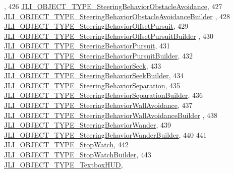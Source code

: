 \begin{DoxyCode}
      ,
426     \mbox{\hyperlink{namespacenjli_a6d56d4fbaf89fcf3e3d32839df05b444a0d10857a9faf274e5f399d970cffab54}{JLI\_OBJECT\_TYPE\_SteeringBehaviorObstacleAvoidance}},
427     \mbox{\hyperlink{namespacenjli_a6d56d4fbaf89fcf3e3d32839df05b444a8db2ac2e3bf1b4b54e8eef5ec82bb31e}{JLI\_OBJECT\_TYPE\_SteeringBehaviorObstacleAvoidanceBuilder}}
      ,
428     \mbox{\hyperlink{namespacenjli_a6d56d4fbaf89fcf3e3d32839df05b444a8f02954dcc21dfbdac47ad78d3fde3f5}{JLI\_OBJECT\_TYPE\_SteeringBehaviorOffsetPursuit}},
429     \mbox{\hyperlink{namespacenjli_a6d56d4fbaf89fcf3e3d32839df05b444ad7d8d479d51b4382207ab5d998aa3cfb}{JLI\_OBJECT\_TYPE\_SteeringBehaviorOffsetPursuitBuilder}}
      ,
430     \mbox{\hyperlink{namespacenjli_a6d56d4fbaf89fcf3e3d32839df05b444a367d51e7c5cf64bc1d4c933291d7b38d}{JLI\_OBJECT\_TYPE\_SteeringBehaviorPursuit}},
431     \mbox{\hyperlink{namespacenjli_a6d56d4fbaf89fcf3e3d32839df05b444a5714a07f3cc466b9f07fdb194d885d1f}{JLI\_OBJECT\_TYPE\_SteeringBehaviorPursuitBuilder}},
432     \mbox{\hyperlink{namespacenjli_a6d56d4fbaf89fcf3e3d32839df05b444a715c36c3ae37b11295f735a932ffd577}{JLI\_OBJECT\_TYPE\_SteeringBehaviorSeek}},
433     \mbox{\hyperlink{namespacenjli_a6d56d4fbaf89fcf3e3d32839df05b444a1a9041dbd8559ce4c692394596594002}{JLI\_OBJECT\_TYPE\_SteeringBehaviorSeekBuilder}},
434     \mbox{\hyperlink{namespacenjli_a6d56d4fbaf89fcf3e3d32839df05b444a181868273499396a4865002154f6dde6}{JLI\_OBJECT\_TYPE\_SteeringBehaviorSeparation}},
435     \mbox{\hyperlink{namespacenjli_a6d56d4fbaf89fcf3e3d32839df05b444a910745b128673320d7bb577b48bda724}{JLI\_OBJECT\_TYPE\_SteeringBehaviorSeparationBuilder}},
436     \mbox{\hyperlink{namespacenjli_a6d56d4fbaf89fcf3e3d32839df05b444ae2b3447851b7ac75116251170282dbc0}{JLI\_OBJECT\_TYPE\_SteeringBehaviorWallAvoidance}},
437     \mbox{\hyperlink{namespacenjli_a6d56d4fbaf89fcf3e3d32839df05b444a8ec8e7414459952bb93962003e257328}{JLI\_OBJECT\_TYPE\_SteeringBehaviorWallAvoidanceBuilder}}
      ,
438     \mbox{\hyperlink{namespacenjli_a6d56d4fbaf89fcf3e3d32839df05b444ad509ed837897d1936482eed231b4380f}{JLI\_OBJECT\_TYPE\_SteeringBehaviorWander}},
439     \mbox{\hyperlink{namespacenjli_a6d56d4fbaf89fcf3e3d32839df05b444a388556f711c9388292a53cf5cedba35d}{JLI\_OBJECT\_TYPE\_SteeringBehaviorWanderBuilder}},
440 
441     \mbox{\hyperlink{namespacenjli_a6d56d4fbaf89fcf3e3d32839df05b444ac0fa0a9dbb9d90ae8dc50821c7a3de13}{JLI\_OBJECT\_TYPE\_StopWatch}},
442     \mbox{\hyperlink{namespacenjli_a6d56d4fbaf89fcf3e3d32839df05b444a2e8e7d5d98c53a5f9f66f8685d3f4df6}{JLI\_OBJECT\_TYPE\_StopWatchBuilder}},
443     \mbox{\hyperlink{namespacenjli_a6d56d4fbaf89fcf3e3d32839df05b444a0383038e50246903540ca9e04d416302}{JLI\_OBJECT\_TYPE\_TextboxHUD}},

\end{DoxyCode}
